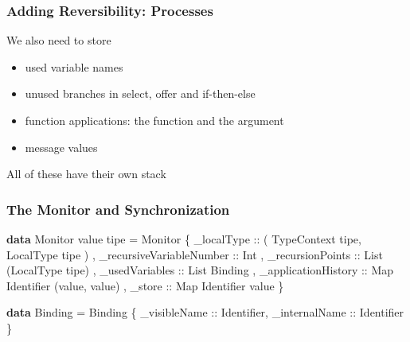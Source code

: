 \documentclass[12pt]{beamer}
\newenvironment{Shaded}{}{}
\newcommand{\KeywordTok}[1]{\textcolor[rgb]{0.00,0.44,0.13}{\textbf{#1}}}
\newcommand{\DataTypeTok}[1]{\textcolor[rgb]{0.56,0.13,0.00}{#1}}
\newcommand{\OtherTok}[1]{\textcolor[rgb]{0.00,0.44,0.13}{#1}}
\newcommand{\FunctionTok}[1]{\textcolor[rgb]{0.02,0.16,0.49}{#1}}
\newcommand{\NormalTok}[1]{#1}
\begin{document}
\begin{frame}[fragile]
\frametitle{Adding Reversibility: Processes}

We also need to store

\begin{itemize}
    \item used variable names
    \item unused branches in select, offer and if-then-else
    \item function applications: the function and the argument
    \item message values
\end{itemize}

All of these have their own stack

\end{frame}

\begin{frame}[fragile]
\frametitle{The Monitor and Synchronization}


\begin{Shaded}
\begin{Highlighting}[]
\KeywordTok{data} \DataTypeTok{Monitor}\NormalTok{ value tipe }\FunctionTok{=} 
    \DataTypeTok{Monitor} 
\NormalTok{        \{}\OtherTok{ \_localType ::} \NormalTok{( }\DataTypeTok{TypeContext}\NormalTok{ tipe,}\DataTypeTok{ LocalType}\NormalTok{ tipe )}
\NormalTok{        ,}\OtherTok{ \_recursiveVariableNumber ::} \DataTypeTok{Int}
\NormalTok{        ,}\OtherTok{ \_recursionPoints ::} \DataTypeTok{List}\NormalTok{ (}\DataTypeTok{LocalType}\NormalTok{ tipe)}
\NormalTok{        ,}\OtherTok{ \_usedVariables ::} \DataTypeTok{List} \DataTypeTok{Binding} 
\NormalTok{        ,}\OtherTok{ \_applicationHistory ::} \DataTypeTok{Map} \DataTypeTok{Identifier}\NormalTok{ (value, value)}
\NormalTok{        ,}\OtherTok{ \_store ::} \DataTypeTok{Map} \DataTypeTok{Identifier}\NormalTok{ value }
\NormalTok{        \}}

\KeywordTok{data} \DataTypeTok{Binding} \FunctionTok{=} 
    \DataTypeTok{Binding}\NormalTok{ \{}\OtherTok{ \_visibleName ::} \DataTypeTok{Identifier}\NormalTok{,}\OtherTok{ _internalName ::} \DataTypeTok{Identifier}\NormalTok{ \} }
\end{Highlighting}
\end{Shaded}

\end{frame}
\end{document}

